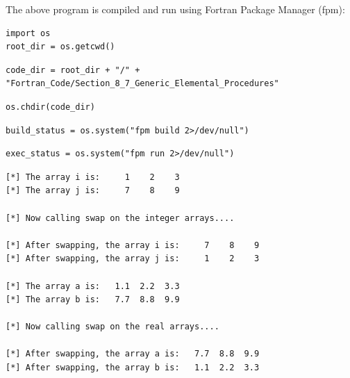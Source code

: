 The above program is compiled and run using Fortran Package Manager (fpm):

\begin{verbatim}
import os
root_dir = os.getcwd()
\end{verbatim}

\begin{verbatim}
code_dir = root_dir + "/" + "Fortran_Code/Section_8_7_Generic_Elemental_Procedures"
\end{verbatim}

\begin{verbatim}
os.chdir(code_dir)
\end{verbatim}

\begin{verbatim}
build_status = os.system("fpm build 2>/dev/null")
\end{verbatim}

\begin{verbatim}
exec_status = os.system("fpm run 2>/dev/null")
\end{verbatim}

\begin{verbatim}
[*] The array i is:     1    2    3
[*] The array j is:     7    8    9

[*] Now calling swap on the integer arrays....

[*] After swapping, the array i is:     7    8    9
[*] After swapping, the array j is:     1    2    3

[*] The array a is:   1.1  2.2  3.3
[*] The array b is:   7.7  8.8  9.9

[*] Now calling swap on the real arrays....

[*] After swapping, the array a is:   7.7  8.8  9.9
[*] After swapping, the array b is:   1.1  2.2  3.3
\end{verbatim}